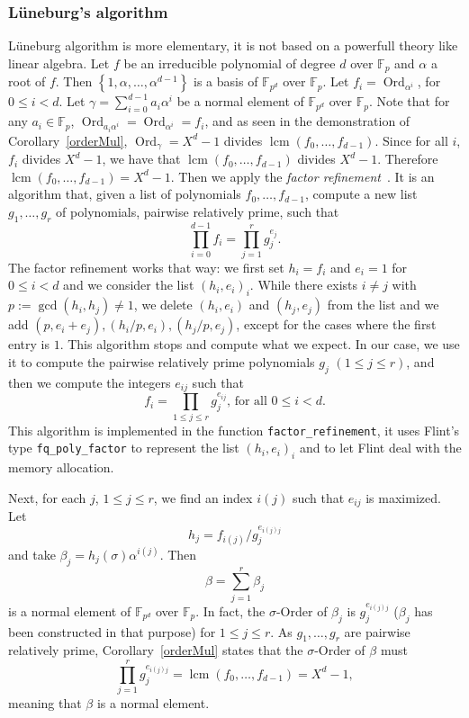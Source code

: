 \documentclass[a4paper,11pt]{article}
\theoremstyle{break}
\theoremstyle{sc}
\theoremstyle{definition}
\theoremstyle{remark}
\DeclareMathOperator{\Ord}{Ord}
\DeclareMathOperator{\lcm}{lcm}
\begin{document}
\subsubsection{Lüneburg's algorithm}
Lüneburg algorithm is more elementary, it is not based on a powerfull theory
like linear algebra. Let $f$ be an irreducible polynomial of degree $d$ over
$\mathbb{F}_p$ and $\alpha$ a root of $f$. Then $\left\{ 1, \alpha, \dots,
  \alpha^{d-1}
\right\}$ is a basis of $\mathbb{F}_{p^d}$ over $\mathbb{F}_p$. Let
$f_i=\Ord_{\alpha^i}$, for $0\leq i < d$. Let
$\gamma=\sum_{i=0}^{d-1}a_i\alpha^i$ be a normal element of
$\mathbb{F}_{p^d}$ over $\mathbb{F}_p$. Note that for any
$a_i\in\mathbb{F}_p$, $\Ord_{a_i\alpha^i}=\Ord_{\alpha^i}=f_i$, and as seen in the
demonstration of Corollary~\ref{orderMul}, $\Ord_\gamma=X^d-1$ divides
$\lcm(f_0, \dots, f_{d-1})$. Since for all $i$, $f_i$ divides $X^d-1$, we have that
$\lcm(f_0, \dots, f_{d-1})$ divides $X^d-1$. Therefore $\lcm(f_0, \dots,
f_{d-1})=X^d-1$. Then we apply the \emph{factor
refinement}~\cite{BaDrSh93}. It is an algorithm that, given a list of
polynomials $f_0, \dots, f_{d-1}$, compute a new list $g_1, \dots, g_r$ of
polynomials, pairwise relatively prime, such that
\[ \prod_{i=0}^{d-1} f_i=\prod_{j=1}^{r} g_j^{e_j}. \]
The factor refinement works that way: we first set $h_i=f_i$ and $e_i=1$ for $0\leq i
<d$ and we consider the list $(h_i, e_i)_{i}$. While there exists $i\neq j$ with $p:=\gcd(h_i, h_j)\neq1$, we delete
$(h_i,e_i)$ and $(h_j,e_j)$ from the list and we add $(p, e_i+e_j),( h_i/p,
e_i), (h_j/p, e_j)$, except for the cases where the first entry is $1$. This
algorithm stops and compute what we expect. In our case, we use it to compute
the pairwise relatively prime polynomials $g_j$ $(1\leq j \leq r)$, and then
we compute the integers $e_{ij}$ such that 
\[
  f_i=\prod_{1\leq j \leq r}g_j^{e_{ij}}\textrm{, for all }0\leq i<d.
\]
This algorithm is implemented in the function
\texttt{factor\_refinement}, it uses Flint's type
\texttt{fq\_poly\_factor} to represent the list $(h_i, e_i)_i$ and to let Flint
deal with the memory allocation.

Next, for each $j$, $1\leq j \leq r$, we find an index $i(j)$ such that
$e_{ij}$ is maximized. Let 
\[
  h_j=f_{i(j)}/g_j^{e_{i(j)j}}
\] 
and take $\beta_j=h_j(\sigma)\alpha^{i(j)}$. Then
\[
  \beta=\sum_{j=1}^r\beta_j
\] 
is a normal element of $\mathbb{F}_{p^d}$ over $\mathbb{F}_p$. In fact, the
$\sigma$-Order of $\beta_j$ is $g_j^{e_{i(j)j}}$ ($\beta_j$ has been
constructed in that purpose) for $1\leq j \leq r$. As $g_1, \dots, g_r$ are
pairwise relatively prime, Corollary~\ref{orderMul} states that the
$\sigma$-Order of $\beta$ must 
\[
  \prod_{j=1}^rg_j^{e_{i(j)j}}=\lcm(f_0, \dots, f_{d-1})=X^d-1,
\]
meaning that $\beta$ is a normal element. 
\end{document}
